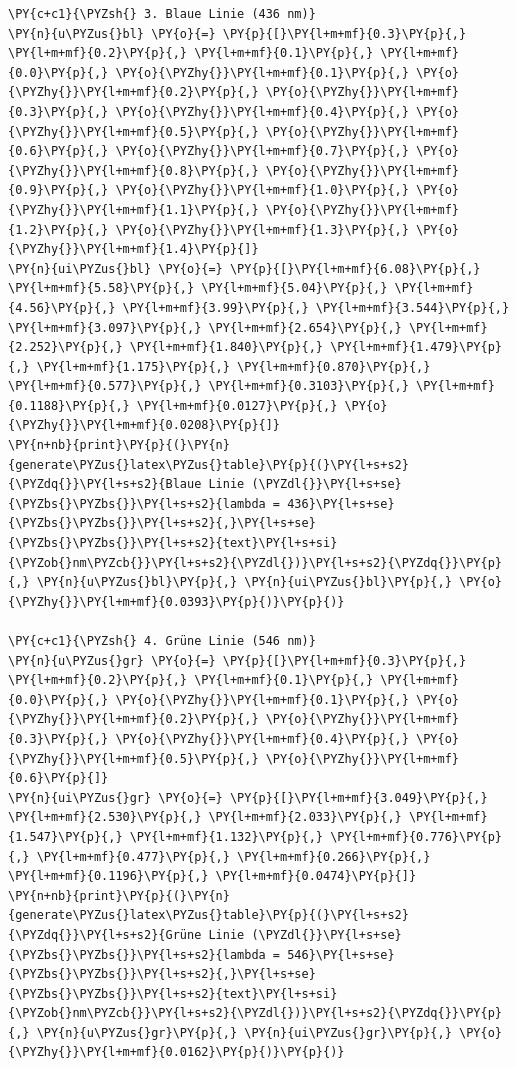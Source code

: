 \begin{tcolorbox}[breakable, size=fbox, boxrule=1pt, pad at break*=1mm,colback=cellbackground, colframe=cellborder]
\begin{Verbatim}[commandchars=\\\{\}]
\PY{c+c1}{\PYZsh{} 3. Blaue Linie (436 nm)}
\PY{n}{u\PYZus{}bl} \PY{o}{=} \PY{p}{[}\PY{l+m+mf}{0.3}\PY{p}{,} \PY{l+m+mf}{0.2}\PY{p}{,} \PY{l+m+mf}{0.1}\PY{p}{,} \PY{l+m+mf}{0.0}\PY{p}{,} \PY{o}{\PYZhy{}}\PY{l+m+mf}{0.1}\PY{p}{,} \PY{o}{\PYZhy{}}\PY{l+m+mf}{0.2}\PY{p}{,} \PY{o}{\PYZhy{}}\PY{l+m+mf}{0.3}\PY{p}{,} \PY{o}{\PYZhy{}}\PY{l+m+mf}{0.4}\PY{p}{,} \PY{o}{\PYZhy{}}\PY{l+m+mf}{0.5}\PY{p}{,} \PY{o}{\PYZhy{}}\PY{l+m+mf}{0.6}\PY{p}{,} \PY{o}{\PYZhy{}}\PY{l+m+mf}{0.7}\PY{p}{,} \PY{o}{\PYZhy{}}\PY{l+m+mf}{0.8}\PY{p}{,} \PY{o}{\PYZhy{}}\PY{l+m+mf}{0.9}\PY{p}{,} \PY{o}{\PYZhy{}}\PY{l+m+mf}{1.0}\PY{p}{,} \PY{o}{\PYZhy{}}\PY{l+m+mf}{1.1}\PY{p}{,} \PY{o}{\PYZhy{}}\PY{l+m+mf}{1.2}\PY{p}{,} \PY{o}{\PYZhy{}}\PY{l+m+mf}{1.3}\PY{p}{,} \PY{o}{\PYZhy{}}\PY{l+m+mf}{1.4}\PY{p}{]}
\PY{n}{ui\PYZus{}bl} \PY{o}{=} \PY{p}{[}\PY{l+m+mf}{6.08}\PY{p}{,} \PY{l+m+mf}{5.58}\PY{p}{,} \PY{l+m+mf}{5.04}\PY{p}{,} \PY{l+m+mf}{4.56}\PY{p}{,} \PY{l+m+mf}{3.99}\PY{p}{,} \PY{l+m+mf}{3.544}\PY{p}{,} \PY{l+m+mf}{3.097}\PY{p}{,} \PY{l+m+mf}{2.654}\PY{p}{,} \PY{l+m+mf}{2.252}\PY{p}{,} \PY{l+m+mf}{1.840}\PY{p}{,} \PY{l+m+mf}{1.479}\PY{p}{,} \PY{l+m+mf}{1.175}\PY{p}{,} \PY{l+m+mf}{0.870}\PY{p}{,} \PY{l+m+mf}{0.577}\PY{p}{,} \PY{l+m+mf}{0.3103}\PY{p}{,} \PY{l+m+mf}{0.1188}\PY{p}{,} \PY{l+m+mf}{0.0127}\PY{p}{,} \PY{o}{\PYZhy{}}\PY{l+m+mf}{0.0208}\PY{p}{]}
\PY{n+nb}{print}\PY{p}{(}\PY{n}{generate\PYZus{}latex\PYZus{}table}\PY{p}{(}\PY{l+s+s2}{\PYZdq{}}\PY{l+s+s2}{Blaue Linie (\PYZdl{}}\PY{l+s+se}{\PYZbs{}\PYZbs{}}\PY{l+s+s2}{lambda = 436}\PY{l+s+se}{\PYZbs{}\PYZbs{}}\PY{l+s+s2}{,}\PY{l+s+se}{\PYZbs{}\PYZbs{}}\PY{l+s+s2}{text}\PY{l+s+si}{\PYZob{}nm\PYZcb{}}\PY{l+s+s2}{\PYZdl{})}\PY{l+s+s2}{\PYZdq{}}\PY{p}{,} \PY{n}{u\PYZus{}bl}\PY{p}{,} \PY{n}{ui\PYZus{}bl}\PY{p}{,} \PY{o}{\PYZhy{}}\PY{l+m+mf}{0.0393}\PY{p}{)}\PY{p}{)}

\PY{c+c1}{\PYZsh{} 4. Grüne Linie (546 nm)}
\PY{n}{u\PYZus{}gr} \PY{o}{=} \PY{p}{[}\PY{l+m+mf}{0.3}\PY{p}{,} \PY{l+m+mf}{0.2}\PY{p}{,} \PY{l+m+mf}{0.1}\PY{p}{,} \PY{l+m+mf}{0.0}\PY{p}{,} \PY{o}{\PYZhy{}}\PY{l+m+mf}{0.1}\PY{p}{,} \PY{o}{\PYZhy{}}\PY{l+m+mf}{0.2}\PY{p}{,} \PY{o}{\PYZhy{}}\PY{l+m+mf}{0.3}\PY{p}{,} \PY{o}{\PYZhy{}}\PY{l+m+mf}{0.4}\PY{p}{,} \PY{o}{\PYZhy{}}\PY{l+m+mf}{0.5}\PY{p}{,} \PY{o}{\PYZhy{}}\PY{l+m+mf}{0.6}\PY{p}{]}
\PY{n}{ui\PYZus{}gr} \PY{o}{=} \PY{p}{[}\PY{l+m+mf}{3.049}\PY{p}{,} \PY{l+m+mf}{2.530}\PY{p}{,} \PY{l+m+mf}{2.033}\PY{p}{,} \PY{l+m+mf}{1.547}\PY{p}{,} \PY{l+m+mf}{1.132}\PY{p}{,} \PY{l+m+mf}{0.776}\PY{p}{,} \PY{l+m+mf}{0.477}\PY{p}{,} \PY{l+m+mf}{0.266}\PY{p}{,} \PY{l+m+mf}{0.1196}\PY{p}{,} \PY{l+m+mf}{0.0474}\PY{p}{]}
\PY{n+nb}{print}\PY{p}{(}\PY{n}{generate\PYZus{}latex\PYZus{}table}\PY{p}{(}\PY{l+s+s2}{\PYZdq{}}\PY{l+s+s2}{Grüne Linie (\PYZdl{}}\PY{l+s+se}{\PYZbs{}\PYZbs{}}\PY{l+s+s2}{lambda = 546}\PY{l+s+se}{\PYZbs{}\PYZbs{}}\PY{l+s+s2}{,}\PY{l+s+se}{\PYZbs{}\PYZbs{}}\PY{l+s+s2}{text}\PY{l+s+si}{\PYZob{}nm\PYZcb{}}\PY{l+s+s2}{\PYZdl{})}\PY{l+s+s2}{\PYZdq{}}\PY{p}{,} \PY{n}{u\PYZus{}gr}\PY{p}{,} \PY{n}{ui\PYZus{}gr}\PY{p}{,} \PY{o}{\PYZhy{}}\PY{l+m+mf}{0.0162}\PY{p}{)}\PY{p}{)}


\end{Verbatim}
\end{tcolorbox}
